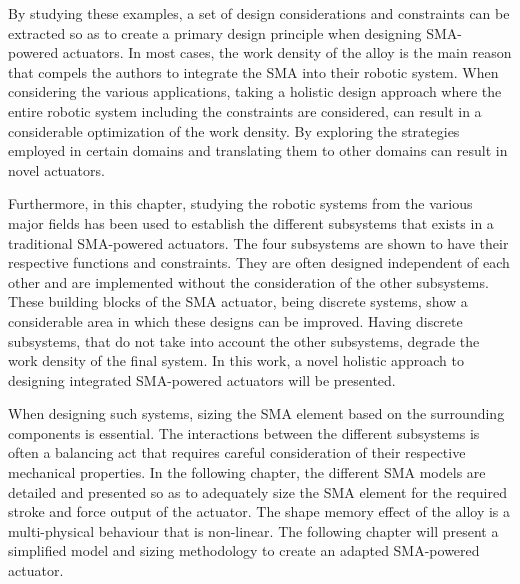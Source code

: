 By studying these examples, a set of design considerations and constraints can be extracted so as to create a primary design principle when designing SMA-powered actuators. In most cases, the work density of the alloy is the main reason that compels the authors to integrate the SMA into their robotic system. When considering the various applications, taking a holistic design approach where the entire robotic system including the constraints are considered, can result in a considerable optimization of the work density. By exploring the strategies employed in certain domains and translating them to other domains can result in novel actuators.

Furthermore, in this chapter, studying the robotic systems from the various major fields has been used to establish the different subsystems that exists in a traditional SMA-powered actuators. The four subsystems are shown to have their respective functions and constraints. They are often designed independent of each other and are implemented without the consideration of the other subsystems. These building blocks of the SMA actuator, being discrete systems, show a considerable area in which these designs can be improved. Having discrete subsystems, that do not take into account the other subsystems, degrade the work density of the final system. In this work, a novel holistic approach to designing integrated SMA-powered actuators will be presented.

When designing such systems, sizing the SMA element based on the surrounding components is essential. The interactions between the different subsystems is often a balancing act that requires careful consideration of their respective mechanical properties. In the following chapter, the different SMA models are detailed and presented so as to adequately size the SMA element for the required stroke and force output of the actuator. The shape memory effect of the alloy is a multi-physical behaviour that is non-linear. The following chapter will present a simplified model and sizing methodology to create an adapted SMA-powered actuator.
